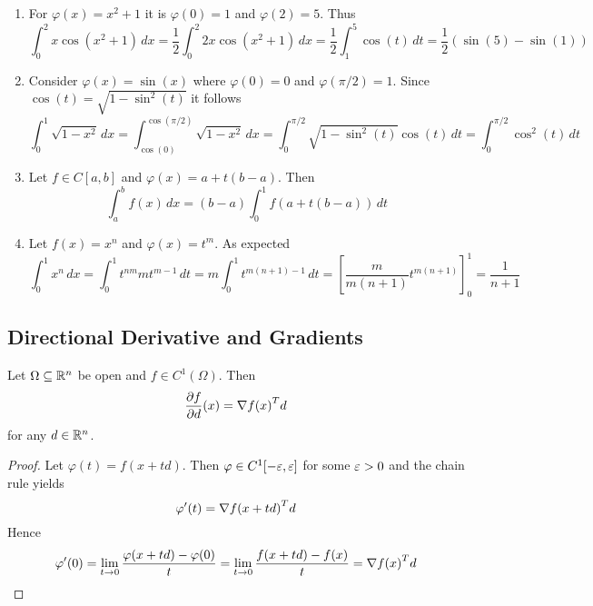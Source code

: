 \begin{examples}\hfill
    \begin{enumerate}
		\item For \( \varphi(x) = x^2 + 1 \) it is \( \varphi(0) = 1 \) and \( \varphi(2) = 5 \). Thus
			\[
				\int_0^2 x\cos(x^2 + 1)\,dx
					= \frac{1}{2} \int_0^2 2x\cos(x^2 + 1)\,dx
					= \frac{1}{2} \int_1^5 \cos(t)\,dt
					= \frac{1}{2} (\sin(5) - \sin(1))
			\]
		\item Consider \( \varphi(x) = \sin(x) \) where \( \varphi(0) = 0 \) and \( \varphi(\pi / 2) = 1 \).
			Since \( \cos(t) = \sqrt{1 - \sin^2(t)} \) it follows
			\[
				\int_0^1 \sqrt{1 - x^2}\,dx
					= \int_{\cos(0)}^{\cos(\pi/2)} \sqrt{1 - x^2}\,dx
					= \int_0^{\pi/2} \sqrt{1 - \sin^2(t)}\cos(t)\,dt
					= \int_0^{\pi/2} \cos^2(t)\,dt
			\]
		\item Let \(f \in C[a,b] \) and \( \varphi(x) = a + t(b - a) \). Then
			\[
				\int_a^b f(x)\,dx = (b - a)\int_0^1 f(a + t(b - a))\,dt
			\]
		\item Let \(f(x) = x^n \) and \( \varphi(x) = t^m \). As expected
			\[
				\int_0^1 x^n\,dx
					= \int_0^1 t^{nm} m t^{m - 1}\,dt
					= m\int_0^1 t^{m(n + 1) - 1}\,dt
					= \left[\frac{m}{m(n + 1)} t^{m(n + 1)}\right]_0^1 
					= \frac{1}{n + 1}
			\]
    \end{enumerate}
\end{examples}
\bigskip


\subsection{Directional Derivative and Gradients}


\begin{lemma}\label{lemma:directional_derivative}
Let \( \Omega \subseteq \mathbb{R}^n \) be open and \( f \in C^1(\Omega) \). Then
\[
    \frac{\partial f}{\partial d}(x) = \nabla{f(x)}^T d
\]
for any \( d \in \mathbb{R}^n \).
\end{lemma}

\begin{proof}
Let \( \varphi(t) = f(x + td) \). Then \( \varphi \in C^1[-\varepsilon, \varepsilon ] \) for some \( \varepsilon > 0 \) 
and the chain rule yields 
\[ 
    \varphi'(t) = {\nabla f(x + td)}^T d 
\]
Hence
\[
    \varphi'(0) = \lim_{t \to 0} \frac{\varphi(x + td) - \varphi(0)}{t} = 
        \lim_{t \to 0} \frac{f(x + td) - f(x)}{t} = {\nabla f(x)}^T d
\]
\end{proof}
\bigskip

